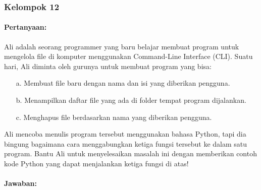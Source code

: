 \documentclass[12pt]{article}
\begin{document}


\subsubsection{Kelompok 12}

\paragraph{Pertanyaan:}
Ali adalah seorang programmer yang baru belajar membuat program untuk mengelola file di komputer menggunakan Command-Line Interface (CLI). Suatu hari, Ali diminta oleh gurunya untuk membuat program yang bisa:

\begin{enumerate}
    \item[a.] Membuat file baru dengan nama dan isi yang diberikan pengguna.
    \item[b.] Menampilkan daftar file yang ada di folder tempat program dijalankan.
    \item[c.] Menghapus file berdasarkan nama yang diberikan pengguna.
\end{enumerate}

Ali mencoba menulis program tersebut menggunakan bahasa Python, tapi dia bingung bagaimana cara menggabungkan ketiga fungsi tersebut ke dalam satu program. Bantu Ali untuk menyelesaikan masalah ini dengan memberikan contoh kode Python yang dapat menjalankan ketiga fungsi di atas!


\paragraph{Jawaban:}
\end{document}
